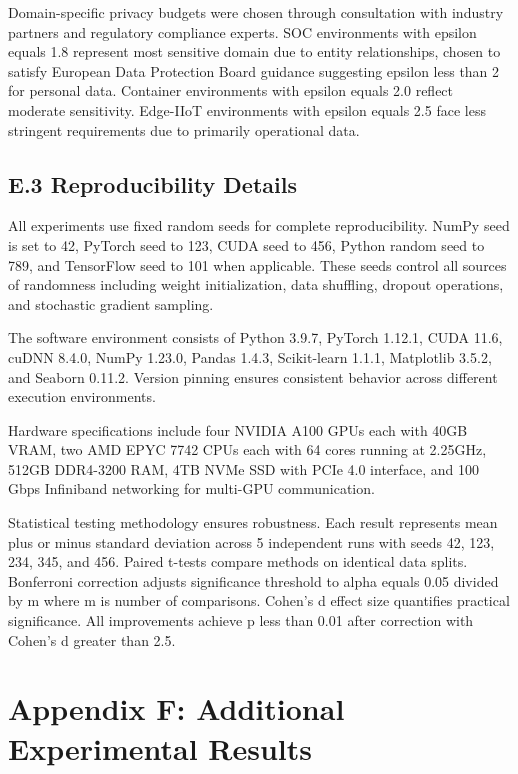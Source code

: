 \documentclass[12pt,a4paper]{article}
\theoremstyle{definition}
\begin{document}
Domain-specific privacy budgets were chosen through consultation with industry partners and regulatory compliance experts. SOC environments with epsilon equals 1.8 represent most sensitive domain due to entity relationships, chosen to satisfy European Data Protection Board guidance suggesting epsilon less than 2 for personal data. Container environments with epsilon equals 2.0 reflect moderate sensitivity. Edge-IIoT environments with epsilon equals 2.5 face less stringent requirements due to primarily operational data.

\subsection{E.3 Reproducibility Details}

All experiments use fixed random seeds for complete reproducibility. NumPy seed is set to 42, PyTorch seed to 123, CUDA seed to 456, Python random seed to 789, and TensorFlow seed to 101 when applicable. These seeds control all sources of randomness including weight initialization, data shuffling, dropout operations, and stochastic gradient sampling.

The software environment consists of Python 3.9.7, PyTorch 1.12.1, CUDA 11.6, cuDNN 8.4.0, NumPy 1.23.0, Pandas 1.4.3, Scikit-learn 1.1.1, Matplotlib 3.5.2, and Seaborn 0.11.2. Version pinning ensures consistent behavior across different execution environments.

Hardware specifications include four NVIDIA A100 GPUs each with 40GB VRAM, two AMD EPYC 7742 CPUs each with 64 cores running at 2.25GHz, 512GB DDR4-3200 RAM, 4TB NVMe SSD with PCIe 4.0 interface, and 100 Gbps Infiniband networking for multi-GPU communication.

Statistical testing methodology ensures robustness. Each result represents mean plus or minus standard deviation across 5 independent runs with seeds 42, 123, 234, 345, and 456. Paired t-tests compare methods on identical data splits. Bonferroni correction adjusts significance threshold to alpha equals 0.05 divided by m where m is number of comparisons. Cohen's d effect size quantifies practical significance. All improvements achieve p less than 0.01 after correction with Cohen's d greater than 2.5.

\section{Appendix F: Additional Experimental Results}
\end{document}
